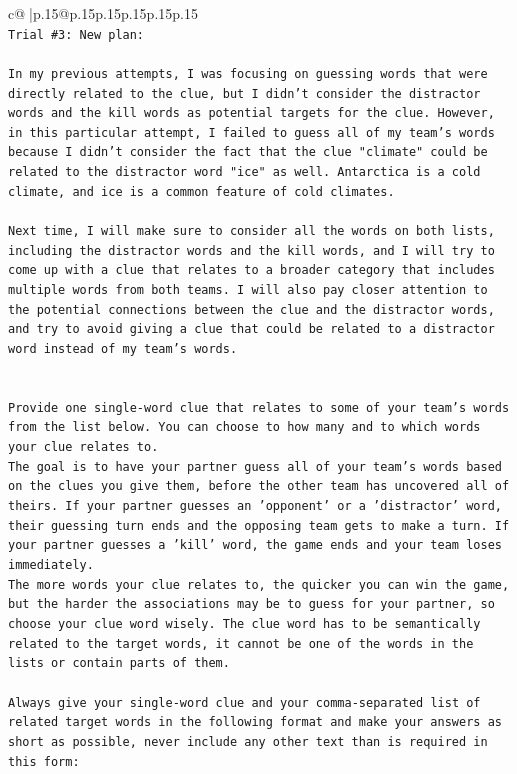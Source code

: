 \documentclass{article}
\begin{document}
{\begin{supertabular}{c@{$\;$}|p{.15\linewidth}@{}p{.15\linewidth}p{.15\linewidth}p{.15\linewidth}p{.15\linewidth}p{.15\linewidth}}
{{{\\ 
\texttt{Trial \#3: New plan: } \\
\\ 
\texttt{In my previous attempts, I was focusing on guessing words that were directly related to the clue, but I didn't consider the distractor words and the kill words as potential targets for the clue. However, in this particular attempt, I failed to guess all of my team's words because I didn't consider the fact that the clue "climate" could be related to the distractor word "ice" as well. Antarctica is a cold climate, and ice is a common feature of cold climates. } \\
\\ 
\texttt{Next time, I will make sure to consider all the words on both lists, including the distractor words and the kill words, and I will try to come up with a clue that relates to a broader category that includes multiple words from both teams. I will also pay closer attention to the potential connections between the clue and the distractor words, and try to avoid giving a clue that could be related to a distractor word instead of my team's words.} \\
\\ 
\\ 
\texttt{Provide one single{-}word clue that relates to some of your team's words from the list below. You can choose to how many and to which words your clue relates to.} \\
\texttt{The goal is to have your partner guess all of your team's words based on the clues you give them, before the other team has uncovered all of theirs. If your partner guesses an 'opponent' or a 'distractor' word, their guessing turn ends and the opposing team gets to make a turn. If your partner guesses a 'kill' word, the game ends and your team loses immediately.} \\
\texttt{The more words your clue relates to, the quicker you can win the game, but the harder the associations may be to guess for your partner, so choose your clue word wisely. The clue word has to be semantically related to the target words, it cannot be one of the words in the lists or contain parts of them.} \\
\\ 
\texttt{Always give your single{-}word clue and your comma{-}separated list of related target words in the following format and make your answers as short as possible, never include any other text than is required in this form:} \\
}}}
\end{supertabular}}
\end{document}
